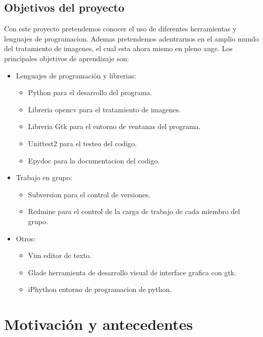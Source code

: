 \documentclass[12pt,a4paper]{report}
\begin{document}
\section{Objetivos del proyecto}
Con este proyecto pretendemos conocer el uso de diferentes herramientas y lenguajes de programacion. Ademas pretendemos adentrarnos en el amplio mundo del tratamiento de imagenes, el cual esta ahora mismo en pleno auge. Los principales objetivos de aprendizaje son:
\begin{itemize}
\item Lenguajes de programación y librerias:
	\begin{itemize}
	\item  Python para el desarrollo del programa.
	\item Libreria opencv para el tratamiento de imagenes.
	\item Libreria Gtk para el entorno de ventanas del programa.
	\item Unittest2 para el testeo del codigo.
	\item Epydoc para la documentacion del codigo.
	\end{itemize}
\item Trabajo en grupo: 
	\begin{itemize}
	\item Subversion para el control de versiones. 
	\item Redmine para el control de la carga de trabajo de cada miembro del grupo.
	\end{itemize}
\item Otros:
	\begin{itemize}
	\item Vim editor de texto.
	\item Glade herramienta de desarrollo visual de interface grafica con gtk.
	\item iPhython entorno de programacion de python.
	\end{itemize}  
	
\end{itemize}

 


\chapter{Motivación y antecedentes}
\end{document}
